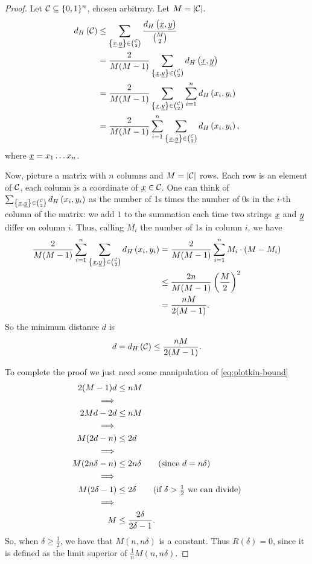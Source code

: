 \begin{proof}
	Let $\mathcal{C} \subseteq \{0, 1\}^n$, chosen arbitrary.
	Let $M = \left|{\mathcal{C}}\right|$.
	\begin{align*}
		d_H \left({\mathcal{C}}\right)
		& \le
		\sum_{\left\{ \underline{x}, \underline{y} \right\} \in \binom{\mathcal{C}}{2}}
		\frac{d_H \left({\underline{x},\underline{y}}\right)}{\binom{M}{2}}
		\\
		& =
		\frac{2}{M (M-1)}
		\sum_{\left\{ \underline{x}, \underline{y} \right\} \in \binom{\mathcal{C}}{2}}
		d_H \left({\underline{x},\underline{y}}\right)
		\\
		& =
		\frac{2}{M (M-1)}
		\sum_{\left\{ \underline{x}, \underline{y} \right\} \in \binom{\mathcal{C}}{2}}
		\sum_{i = 1}^n d_H \left({x_i, y_i}\right)
		\\
		& =
		\frac{2}{M (M-1)}
		\sum_{i = 1}^n
		\sum_{\left\{ \underline{x}, \underline{y} \right\} \in \binom{\mathcal{C}}{2}} d_H \left({x_i, y_i}\right),
	\end{align*}
	where $\underline{x} = x_1 \dots x_n$.

	Now, picture a matrix with $n$ columns and $M = \left|{\mathcal{C}}\right|$ rows.
	Each row is an element of $\mathcal{C}$, each column is a coordinate of $\underline{x} \in \mathcal{C}$.
	One can think of $\sum_{\left\{ \underline{x}, \underline{y} \right\} \in \binom{\mathcal{C}}{2}} d_H \left({x_i, y_i}\right)$ as the number of 1s times the number of 0s in the $i$-th column of the matrix: we add $1$ to the summation each time two strings $\underline{x}$ and $\underline{y}$ differ on column $i$.
	Thus, calling $M_i$ the number of 1s in column $i$, we have
	\begin{align*}
		\frac{2}{M (M-1)}
		\sum_{i = 1}^n
		\sum_{\left\{ \underline{x}, \underline{y} \right\} \in \binom{\mathcal{C}}{2}} d_H \left({x_i, y_i}\right)
		& =
		\frac{2}{M (M-1)}
		\sum_{i = 1}^{n}
		M_i \cdot \left( M - M_i \right)
		\\
		& \le
		\frac{2n}{M (M-1)} \left( \frac{M}{2} \right)^2
		\\
		& =
		\frac{n M}{2 (M-1)}.
	\end{align*}
	So the minimum distance $d$ is
	\begin{equation} \label{eq:plotkin-bound}
		d = d_H \left({\mathcal{C}}\right) \le \frac{n M}{2 (M-1)}.
	\end{equation}

	To complete the proof we just need some manipulation of \cref{eq:plotkin-bound}
	\begin{align*}
		2 (M - 1) d & \le n M
		\\
		\implies &
		\\
		2 M d - 2 d & \le n M
		\\
		\implies &
		\\
		M (2 d - n) & \le 2 d
		\\
		\implies &
		\\
		M (2 n \delta - n) & \le 2 n \delta
		\tag{since $d = n \delta$}
		\\
		\implies &
		\\
		M (2 \delta - 1) & \le 2 \delta
		\tag{if $\delta > \frac{1}{2}$ we can divide}
		\\
		\implies &
		\\
		M & \le \frac{2 \delta}{2 \delta - 1}.
	\end{align*}
	So, when $\delta \ge \frac{1}{2}$, we have that $M(n, n \delta)$ is a constant.
	Thus $R(\delta) = 0$, since it is defined as the limit superior of $\frac{1}{n} M(n, n \delta)$.
\end{proof}

